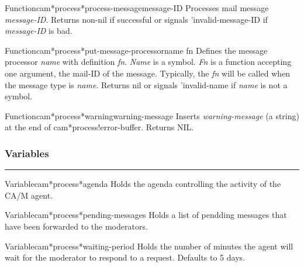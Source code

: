 \begin{functiondoc}{Function}{cam*process*process-message}{message-ID}
Processes mail message {\em message-ID}.
Returns non-nil if successful or signals 'invalid-message-ID if {\em message-ID} is bad.
\end{functiondoc}

\begin{functiondoc}{Function}{cam*process*put-message-processor}{name fn}
Defines the message processor {\em name} with definition {\em fn}.
{\em Name} is a symbol.
{\em Fn} is a function accepting one argument, the mail-ID of the message.
Typically, the {\em fn} will be called when the message type is {\em name}.
Returns nil or signals 'invalid-name if {\em name} is not a symbol.
\end{functiondoc}

\begin{functiondoc}{Function}{cam*process*warning}{warning-message}
Inserts {\em warning-message} (a string) at the end of cam*process!error-buffer.
Returns NIL.
\end{functiondoc}


\subsubsection*{Variables}
\par\vspace*{0.00in}\par\hrule\par\medskip\par


\begin{functiondoc}{Variable}{cam*process*agenda}{}
Holds the agenda controlling the activity of the CA/M agent.
\end{functiondoc}

\begin{functiondoc}{Variable}{cam*process*pending-messages}{}
Holds a list of pendding messages that have been forwarded to the moderators.
\end{functiondoc}

\begin{functiondoc}{Variable}{cam*process*waiting-period}{}
Holds the number of minutes the agent will wait for the moderator to 
respond to a request.  
Defaults to 5 days.
\end{functiondoc}



